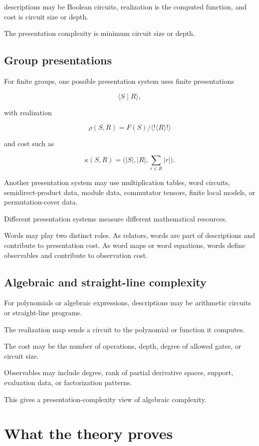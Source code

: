 \documentclass[11pt]{article}
\begin{document}
descriptions may be Boolean circuits, realization is the computed function, and cost is circuit size or depth.

The presentation complexity is minimum circuit size or depth.


\subsection{Group presentations}

For finite groups, one possible presentation system uses finite presentations

\[
\langle S\mid R\rangle,
\]

with realization

\[
\rho(S,R)=F(S)/\langle!\langle R\rangle!\rangle
\]

and cost such as

\[
\kappa(S,R)=\bigl(|S|,|R|,\sum_{r\in R}|r|\bigr).
\]

Another presentation system may use multiplication tables, word circuits, semidirect-product data, module data, commutator tensors, finite local models, or permutation-cover data.

Different presentation systems measure different mathematical resources.

Words may play two distinct roles. As relators, words are part of descriptions and contribute to presentation cost. As word maps or word equations, words define observables and contribute to observation cost.


\subsection{Algebraic and straight-line complexity}

For polynomials or algebraic expressions, descriptions may be arithmetic circuits or straight-line programs.

The realization map sends a circuit to the polynomial or function it computes.

The cost may be the number of operations, depth, degree of allowed gates, or circuit size.

Observables may include degree, rank of partial derivative spaces, support, evaluation data, or factorization patterns.

This gives a presentation-complexity view of algebraic complexity.


\section{What the theory proves}
\end{document}
